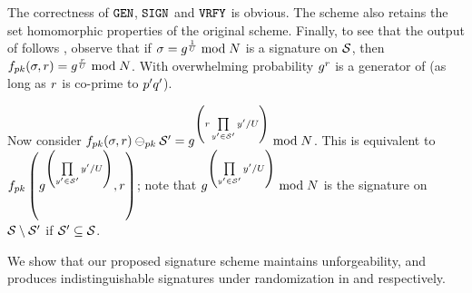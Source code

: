 \itemListEnd


\smallskip
The correctness of $\keyGen$, $\signingAlg$ and $\verify$ is obvious. The scheme also retains the 
set homomorphic properties of the original scheme. Finally, to see that the output of 
\randomize follows , 
observe that if $\genericSig = \qrGen^{\frac{1}{\accSet}} \bmod \rsaMod$ is a signature on 
$\genericSetVar$, then $\randomizeFn[\pubKey](\genericSig, \genericRand) = 
\qrGen^{\frac{\genericRand}{\accSet}} \bmod \rsaMod$. With overwhelming probability 
$\qrGen^{\genericRand}$ is 
a generator of \qrGroup (as long as $\genericRand$ is co-prime to 
$\sgPrime[1]\sgPrime[2]$). 

 Now consider $\randomizeFn[\pubKey](\genericSig, \genericRand) 
\sigMinus[\pubKey] \genericSetVarAlt = \qrGen^{\left(\genericRand \prod\limits_{\genericCInputElmt' \in 
	\genericSetVarAlt} \genericCInputElmt'/\accSet\right)} \bmod \rsaMod$. This is equivalent to 
$\randomizeFn[\pubKey]\left(\qrGen^{\left(\prod\limits_{\genericCInputElmt' \in \genericSetVarAlt} 
\genericCInputElmt'/\accSet\right)}, \genericRand\right)$; note 
that $\qrGen^{\left(\prod\limits_{\genericCInputElmt' \in 
		\genericSetVarAlt} \genericCInputElmt'/\accSet\right)} \bmod \rsaMod$ is the signature on 
$\genericSetVar \setminus \genericSetVarAlt$ if $\genericSetVarAlt \subseteq \genericSetVar$.  


We show that our proposed signature scheme maintains unforgeability, and produces indistinguishable signatures under randomization in  and  respectively.  


